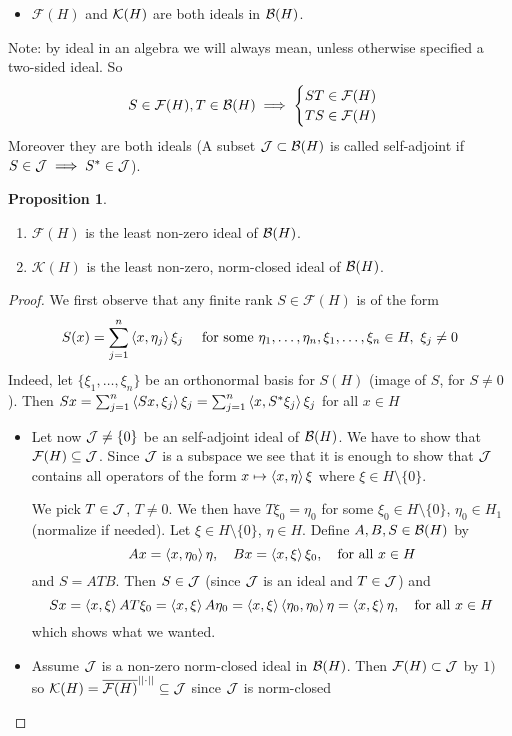 \documentclass[10pt,english,a4paper]{article}
\theoremstyle{definition}
\newtheorem*{proposition}{Proposition}
\let\emph\relax %
\def\Ff{\mathcal{F}}
\def\Kf{\mathcal{K}}
\begin{document}
\begin{itemize}
    \item $\Ff(H)$ and $\mathcal{K}(H)$ are both ideals in $\mathcal{B}(H)$. 
\end{itemize}
Note: by ideal in an algebra we will always mean, unless otherwise specified a two-sided ideal.
So 
\[S \in \Ff(H), T \in \Bs(H)  \implies \begin{cases} ST \in \Ff(H) \\ TS \in \Ff(H) \end{cases}\]
Moreover they are both \emph{self-adjoint} ideals (A subset $\mathcal{J} \subset
\mathcal{B}(H)$ is called self-adjoint if $S \in \mathcal{J} \implies S^* \in \mathcal{J}$).
\begin{proposition}
\leavevmode
\begin{enumerate}[1)]
        \item $\Ff(H)$ is the least non-zero ideal of $\mathcal{B}(H)$. 
        \item $\Kf(H)$ is the least non-zero, norm-closed ideal of $\mathcal{B}(H)$. 
    \end{enumerate}
\end{proposition}
\begin{proof}
    We first observe that any finite rank $S \in \Ff(H)$ is of the form 
    \[ S(x) = \sum_{j=1}^{n} \left\langle x,\eta_j \right\rangle\xi_j  \quad \text{ for some }\eta_1, 
    \ldots, \eta_n,\xi_1,\ldots, \xi_n\in H, ~\xi_j \neq 0\]
    Indeed, let $\{\xi_1, \ldots, \xi_n\}$ be an orthonormal basis for $S(H)$ (image of $S$, for $S\neq 0$). Then $Sx = \sum_{j=1}^{n} \left\langle Sx, \xi_j \right\rangle\xi_j = \sum_{j=1}^{n}\left\langle x,S^*\xi_j \right\rangle\xi_j$ for all $x \in H$

\begin{itemize}
    \item 
Let now $\mathcal{J} \neq \{0\}$ be an self-adjoint ideal of $\mathcal{B}(H)$. We have to show that 
$\Ff(H) \subseteq \Js$. Since $\mathcal{J}$ is a subspace we see that it is enough to show that 
$\mathcal{J}$ contains all operators of the form $x\mapsto \left\langle x,\eta \right\rangle\xi$ where $\xi
\in H\setminus\{0\}$.

We pick $T \in \mathcal{J}$, $T \neq 0$. We then have $T\xi_0 = \eta_0$ for some 
$\xi_0 \in H\setminus\{0\}$, $\eta_0 \in H_1$ (normalize if needed). Let
$\xi\in H\setminus\{0\}$, $\eta \in H$. Define $A,B,S \in \mathcal{B}(H)$ by 
\[  Ax = \left\langle x,\eta_0 \right\rangle\eta, \quad Bx = \left\langle x,\xi \right\rangle\xi_0, \quad \text{for all } x\in H \]
and $S = ATB$. Then $S \in \mathcal{J}$ (since $\mathcal{J}$ is an ideal and $T \in \mathcal{J}$) and 
\[Sx = \left\langle x,\xi \right\rangle AT\xi_0 = \left\langle x,\xi \right\rangle A\eta_0 = \left\langle x,\xi \right\rangle \left\langle \eta_0,\eta_0 \right\rangle\eta
= \left\langle x,\xi \right\rangle\eta, \quad \text{for all }x\in H\]
which shows what we wanted.

\item Assume $\mathcal{J}$ is a non-zero norm-closed ideal in $\mathcal{B}(H)$. Then $\Ff(H) \subset \Js$
by $1)$ so $\Kf(H) =\ol{\Ff(H)}^{||\cdot||}  \subseteq \Js$ since $\mathcal{J}$ is norm-closed
\end{itemize}
\end{proof}
\end{document}
